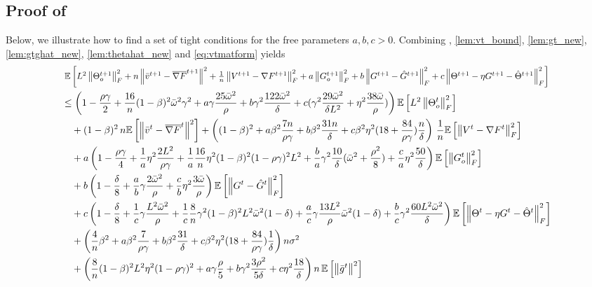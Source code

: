 \documentclass[10pt]{article} %
\theoremstyle{plain}
\theoremstyle{definition}
\theoremstyle{remark}
\newcommand{\grdF}{\nabla F}
\newcommand{\bw}{\bar{\omega}}
\newcommand{\avgg}{\bar{g}}
\newcommand{\norm}[1]{\left\| #1 \right\|}
\newcommand{\nl}{\nonumber\\}
\newcommand{\avggrdF}{\overline{\nabla F}}
\newcommand{\avgv}{\bar{v}}
\begin{document}
\subsection{Proof of } \label{app:wholesys}
Below, we illustrate how to find a set of tight conditions for the free parameters $a,b,c>0$.
Combining , \ref{lem:vt_bound}, \ref{lem:gt_new}, \ref{lem:gtghat_new}, \ref{lem:thetahat_new} and \eqref{eq:vtmatform} yields
\begin{align*}
    &\scalebox{0.9}{ $\mathbb{E} \left[ L^2 \norm{\Theta_o^{t+1}}_F^2 + n \norm{ \avgv^{t+1} - \avggrdF^{t+1}}^2 + \frac{1}{n} \norm{V^{t+1} - \grdF^{t+1} }_F^2 + a \norm{G_o^{t+1}}_F^2 + b \norm{ G^{t+1} - \hat{G}^{t+1} }_F^2 + c \norm{ \Theta^{t+1} - \eta G^{t+1} - \hat{\Theta}^{t+1} }_F^2 \right]$ }
    \nl &\leq \left( 1 - \frac{\rho\gamma}{2} + \frac{16}{n}(1-\beta)^2\bw^2\gamma^2 + a\gamma\frac{25\bw^2}{\rho} + b\gamma^2 \frac{122\bw^2}{\delta} + c(\gamma^2\frac{29\bw^2}{\delta L^2} + \eta^2 \frac{38\bw}{\rho})\right) 
\mathbb{E}\left[L^2 \norm{ \Theta_o^t}_F^2\right]
    \nl &\quad + ( 1 - \beta )^2 \, n \mathbb{E}\left[ \norm{ \avgv^t - \avggrdF^t }^2 \right] + \left( (1-\beta)^2 + a\beta^2\frac{7n}{\rho\gamma} + b\beta^2 \frac{31n}{\delta} + c \beta^2\eta^2 (18 + \frac{84}{\rho\gamma}) \frac{n}{\delta} \right) \, \frac{1}{n} 
\mathbb{E}\left[\norm{ V^{t} - \grdF^{t} }_F^2\right]
    \nl &\quad + a\left( 1-\frac{\rho\gamma}{4} + \frac{1}{a}\eta^2\frac{2L^2}{\rho\gamma} + \frac{1}{a} \frac{16}{n} \eta^2(1-\beta)^2 (1-\rho\gamma)^2 L^2 + \frac{b}{a}\gamma^2 \frac{10}{\delta} (\bw^2 + \frac{\rho^2}{8}) + \frac{c}{a}\eta^2\frac{50}{\delta} \right) 
\mathbb{E}\left[\norm{ G_o^{t} }_F^2\right]
    \nl &\quad + b \left(1-\frac{\delta}{8} + \frac{a}{b}\gamma\frac{2\bw^2}{\rho} +  \frac{c}{b}\eta^2\frac{3\bw}{\rho} \right) 
\mathbb{E}\left[\norm{ G^{t} - \hat{G}^{t} }_F^2\right]
    \nl &\quad + c\left(1-\frac{\delta}{8} + \frac{1}{c}\gamma\frac{L^2\bw^2}{\rho} + \frac{1}{c} \frac{8}{n} \gamma^2(1-\beta)^2L^2\bw^2(1-\delta) + \frac{a}{c}\gamma\frac{13L^2}{\rho}\bw^2(1-\delta) + \frac{b}{c}\gamma^2 \frac{60L^2\bw^2}{\delta} \right) 
\mathbb{E}\left[\norm{ \Theta^{t} - \eta G^{t} - \hat{\Theta}^{t}}_F^2\right]
    \nl &\quad + \left( \frac{4}{n} \beta^2 + a\beta^2\frac{7}{\rho\gamma} + b\beta^2\frac{31}{\delta} + c\beta^2\eta^2(18+\frac{84}{\rho\gamma})\frac{1}{\delta}\right)
n\sigma^2
    \nl &\quad + \left( \frac{8}{n} (1-\beta)^2 L^2 \eta^2 (1-\rho\gamma)^2 + a\gamma \frac{\rho}{5} + b\gamma^2 \frac{3\rho^2}{5\delta} + c\eta^2 \frac{18}{\delta} \right)
n\,\mathbb{E}\left[ \norm{\avgg^t}^2 \right]
\end{align*}
\end{document}
